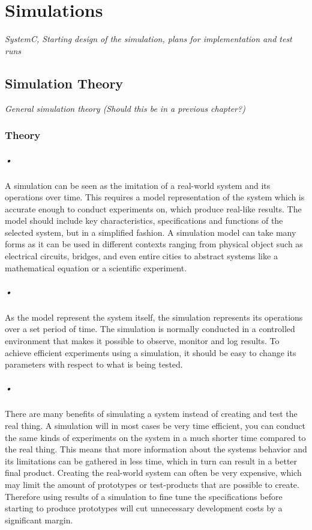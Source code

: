 \documentclass[a4paper, 12pt]{report}
\begin{document}
\chapter{Simulations}
\label{cha:4}
\textit{SystemC, Starting design of the simulation, plans for implementation and test runs}

\section{Simulation Theory}
\textit{General simulation theory (Should this be in a previous chapter?)}

\subsection{Theory}
\paragraph{•}
A simulation can be seen as the imitation of a real-world system and its operations over time.
This requires a model representation of the system which is accurate enough to conduct experiments on, which produce real-like results.
The model should include key characteristics, specifications and functions of the selected system, but in a simplified fashion.
A simulation model can take many forms as it can be used in different contexts ranging from physical object such as electrical circuits, bridges, and even entire cities to abstract systems like a mathematical equation or a scientific experiment\cite{simulations}.

\paragraph{•}
As the model represent the system itself, the simulation represents its operations over a set period of time.
The simulation is normally conducted in a controlled environment that makes it possible to observe, monitor and log results.
To achieve efficient experiments using a simulation, it should be easy to change its parameters with respect to what is being tested.

\paragraph{•}
There are many benefits of simulating a system instead of creating and test the real thing.
A simulation will in most cases be very time efficient, you can conduct the same kinds of experiments on the system in a much shorter time compared to the real thing.
This means that more information about the systems behavior and its limitations can be gathered in less time, which in turn can result in a better final product.
Creating the real-world system can often be very expensive, which may limit the amount of prototypes or test-products that are possible to create.
Therefore using results of a simulation to fine tune the specifications before starting to produce prototypes will cut unnecessary development costs by a significant margin.
\end{document}
